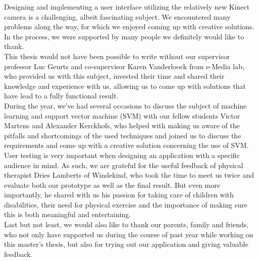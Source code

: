 Designing and implementing a user interface utilizing the relatively new Kinect camera is a challenging, albeit fascinating subject. We encountered many problems along the way, for which we enjoyed coming up with creative solutions. In the process, we were supported by many people we definitely would like to thank.\\

This thesis would not have been possible to write without our supervisor professor Luc Geurts and co-supervisor Karen Vanderloock from e-Media lab, who provided us with this subject, invested their time and shared their knowledge and experience with us, allowing us to come up with solutions that have lead to a fully functional result.\\

During the year, we've had several occasions to discuss the subject of machine learning and support vector machine (SVM) with our fellow students Victor Martens and Alexander Kerckhofs, who helped with making us aware of the pitfalls and shortcomings of the used techniques and joined us to discuss the requirements and come up with a creative solution concerning the use of SVM.\\

User testing is very important when designing an application with a specific audience in mind. As such, we are grateful for the useful feedback of physical therapist Dries Lamberts of Windekind, who took the time to meet us twice and evaluate both our prototype as well as the final result. But even more importantly, he shared with us his passion for taking care of children with disabilities, their need for physical exercise and the importance of making sure this is both meaningful and entertaining.\\

Last but not least, we would also like to thank our parents, family and friends, who not only have supported us during the course of past year while working on this master's thesis, but also for trying out our application and giving valuable feedback.
